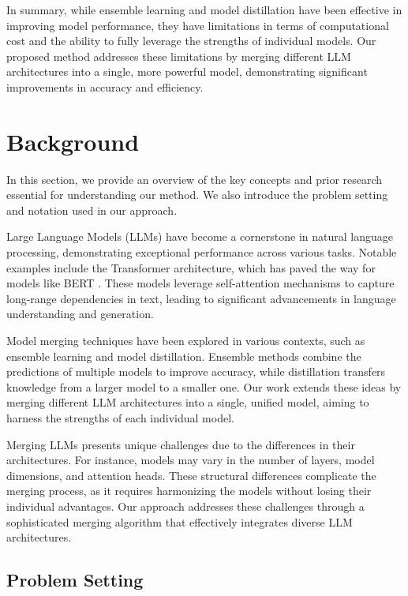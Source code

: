 \documentclass{article} %
\begin{document}
In summary, while ensemble learning and model distillation have been effective in improving model performance, they have limitations in terms of computational cost and the ability to fully leverage the strengths of individual models. Our proposed method addresses these limitations by merging different LLM architectures into a single, more powerful model, demonstrating significant improvements in accuracy and efficiency.

\section{Background}
\label{sec:background}

In this section, we provide an overview of the key concepts and prior research essential for understanding our method. We also introduce the problem setting and notation used in our approach.

Large Language Models (LLMs) have become a cornerstone in natural language processing, demonstrating exceptional performance across various tasks. Notable examples include the Transformer architecture, which has paved the way for models like BERT \citep{Devlin2019BERTPO}. These models leverage self-attention mechanisms to capture long-range dependencies in text, leading to significant advancements in language understanding and generation.

Model merging techniques have been explored in various contexts, such as ensemble learning and model distillation. Ensemble methods combine the predictions of multiple models to improve accuracy, while distillation transfers knowledge from a larger model to a smaller one. Our work extends these ideas by merging different LLM architectures into a single, unified model, aiming to harness the strengths of each individual model.

Merging LLMs presents unique challenges due to the differences in their architectures. For instance, models may vary in the number of layers, model dimensions, and attention heads. These structural differences complicate the merging process, as it requires harmonizing the models without losing their individual advantages. Our approach addresses these challenges through a sophisticated merging algorithm that effectively integrates diverse LLM architectures.

\subsection{Problem Setting}
\label{sec:problem_setting}
\end{document}
